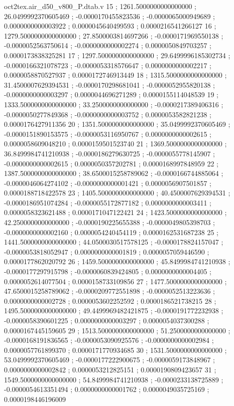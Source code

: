 \begin{filecontents}[overwrite]{oct2tex.air_d50_v800_P.dtab.v}
15 ; 1261.5000000000000000 ; 26.0499992370605469 ; -0.0000170455823536 ; -0.0000065000949689 ; 0.0000000000003922 ; 0.0000045640499593 ; 0.0000216541266127
16 ; 1279.5000000000000000 ; 27.8500003814697266 ; -0.0000171969550138 ; -0.0000052563750614 ; -0.0000000000002274 ; 0.0000050849703257 ; 0.0000173838325281
17 ; 1297.5000000000000000 ; 29.6499996185302734 ; -0.0000166321078723 ; -0.0000053318576647 ; 0.0000000000002217 ; 0.0000058870527937 ; 0.0000172746913449
18 ; 1315.5000000000000000 ; 31.4500007629394531 ; -0.0000170298681041 ; -0.0000052955820138 ; -0.0000000000003297 ; 0.0000044696271289 ; 0.0000155114048539
19 ; 1333.5000000000000000 ; 33.2500000000000000 ; -0.0000217389406316 ; -0.0000050277849368 ; -0.0000000000003752 ; 0.0000053582821238 ; 0.0000176427911356
20 ; 1351.5000000000000000 ; 35.0499992370605469 ; -0.0000151890153575 ; -0.0000053116950767 ; 0.0000000000002615 ; 0.0000058609048210 ; 0.0000159501523740
21 ; 1369.5000000000000000 ; 36.8499984741210938 ; -0.0000186279630725 ; -0.0000055778145907 ; -0.0000000000002615 ; 0.0000050357202781 ; 0.0000168997848959
22 ; 1387.5000000000000000 ; 38.6500015258789062 ; -0.0000166744885064 ; -0.0000046064274102 ; -0.0000000000001421 ; 0.0000056907501857 ; 0.0000188718422578
23 ; 1405.5000000000000000 ; 40.4500007629394531 ; -0.0000186951074284 ; -0.0000055172877182 ; 0.0000000000003411 ; 0.0000058323621488 ; 0.0000171047122421
24 ; 1423.5000000000000000 ; 42.2500000000000000 ; -0.0000190225655388 ; -0.0000049805398703 ; -0.0000000000002160 ; 0.0000054240454119 ; 0.0000162531687238
25 ; 1441.5000000000000000 ; 44.0500030517578125 ; -0.0000178824157047 ; -0.0000053818052947 ; 0.0000000000001819 ; 0.0000057059446590 ; 0.0000177862020792
26 ; 1459.5000000000000000 ; 45.8499984741210938 ; -0.0000177297915798 ; -0.0000060839424805 ; 0.0000000000004405 ; 0.0000052614077504 ; 0.0000158733109856
27 ; 1477.5000000000000000 ; 47.6500015258789062 ; -0.0000209772551898 ; -0.0000052513223636 ; 0.0000000000002728 ; 0.0000053602252592 ; 0.0000186521738215
28 ; 1495.5000000000000000 ; 49.4499969482421875 ; -0.0000191772232938 ; -0.0000058390601225 ; 0.0000000000003297 ; 0.0000054037300288 ; 0.0000167445159605
29 ; 1513.5000000000000000 ; 51.2500000000000000 ; -0.0000168191836565 ; -0.0000053090925576 ; -0.0000000000002984 ; 0.0000057761899370 ; 0.0000171770934685
30 ; 1531.5000000000000000 ; 53.0499992370605469 ; -0.0000177222900675 ; -0.0000059173848967 ; 0.0000000000002842 ; 0.0000053212825151 ; 0.0000190809423657
31 ; 1549.5000000000000000 ; 54.8499984741210938 ; -0.0000233138725889 ; -0.0000054613351494 ; 0.0000000000001762 ; 0.0000049035725169 ; 0.0000198446196009

\end{filecontents}
